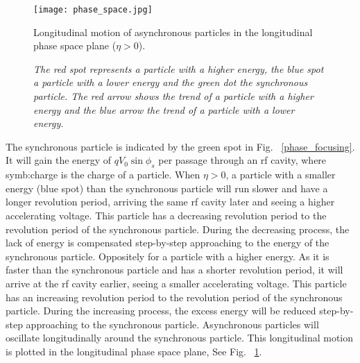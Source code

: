\begin{figure}[!htb]
   \centering   
   \texttt{[image: phase\_space.jpg]}
   \caption{Longitudinal motion of asynchronous particles in the longitudinal phase space plane ($\eta > 0$).}
	\caption*{\textsl{\small{The red spot represents a particle with a higher energy, the blue spot a particle with a lower energy and the green dot the synchronous particle. The red arrow shows the trend of a particle with a higher energy and the blue arrow the trend of a particle with a lower energy.}}}
   \label{phase_space}
\end{figure}
The synchronous particle is indicated by the green spot in Fig. ~\ref{phase_focusing}. It will gain the energy of $qV_0\sin\phi_{\mathit{s}}$ per passage through an rf cavity, where \gls{symb:charge} is the charge of a particle.  When $\eta > 0$, a particle with a smaller energy (blue spot) than the synchronous particle will run slower and have a longer revolution period, arriving the same rf cavity later and seeing a higher accelerating voltage. This particle has a decreasing revolution period to the revolution period of the synchronous particle. During the decreasing process, the lack of energy is compensated step-by-step approaching to the energy of the synchronous particle. Oppositely for a particle with a higher energy. As it is faster than the synchronous particle and has a shorter revolution period, it will arrive at the rf cavity earlier, seeing a smaller accelerating voltage. This particle has an increasing revolution period to the revolution period of the synchronous particle. During the increasing process, the excess energy will be reduced step-by-step approaching to the synchronous particle. Asynchronous particles will oscillate longitudinally around the synchronous particle. This longitudinal motion is plotted in the longitudinal phase space plane, See Fig. ~\ref{phase_space}.

